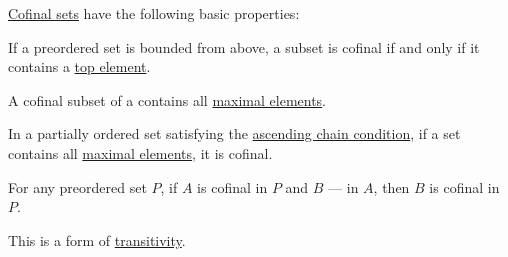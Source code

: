 \begin{proposition}\label{thm:def:cofinal_set}
  \hyperref[def:cofinal_set]{Cofinal sets} have the following basic properties:
  \begin{thmenum}
     If a preordered set is bounded from above, a subset is cofinal if and only if it contains a \hyperref[def:extremal_points/top_and_bottom]{top element}.

     A cofinal subset of a  contains all \hyperref[def:extremal_points/maximal_and_minimal_element]{maximal elements}.

     In a partially ordered set satisfying the \hyperref[def:chain_condition]{ascending chain condition}, if a set contains all \hyperref[def:extremal_points/maximal_and_minimal_element]{maximal elements}, it is cofinal.

     For any preordered set \( P \), if \( A \) is cofinal in \( P \) and \( B \) --- in \( A \), then \( B \) is cofinal in \( P \).

    This is a form of \hyperref[def:binary_relation/transitive]{transitivity}.
  \end{thmenum}
\end{proposition}
